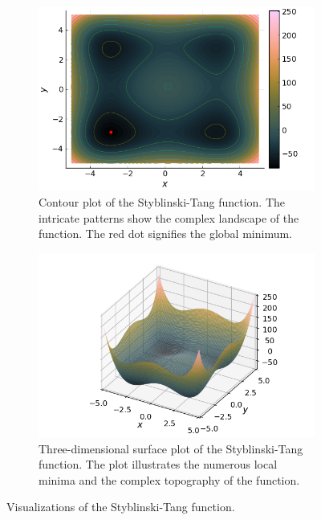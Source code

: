   \begin{figure}[ht!]
    \centering
    \begin{subfigure}[b]{0.45\textwidth}
      \centering
      \includegraphics[width=\textwidth]{img/test_functions/styblinski_tang_contour.png}
      \caption{
        Contour plot of the Styblinski-Tang function.
        The intricate patterns show the complex landscape of the function.
        The red dot signifies the global minimum.
      }
      \label{fig:app:test:styblinski_tang:contour}
    \end{subfigure}
    \hfill
    \begin{subfigure}[b]{0.45\textwidth}
      \centering
      \includegraphics[width=\textwidth]{img/test_functions/styblinski_tang_surface.png}
      \caption{
        Three-dimensional surface plot of the Styblinski-Tang function.
        The plot illustrates the numerous local minima and the complex topography of the function.
      }
      \label{fig:app:test:styblinski_tang:surface}
    \end{subfigure}
    \caption{Visualizations of the Styblinski-Tang function.}
    \label{fig:app:test:styblinski_tang}
  \end{figure}